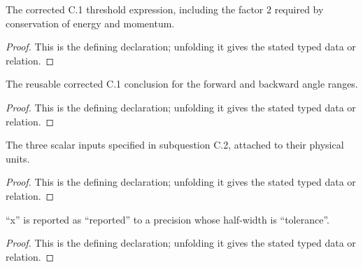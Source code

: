 \begin{definition}
  \label{decl:physics:IPhO_2026_1_C_2:quotedC1ThresholdExpression}
  The corrected C.1 threshold expression, including the factor \(2\) required by conservation of energy and momentum.
\end{definition}
\begin{proof}
  This is the defining declaration; unfolding it gives the stated typed data or relation.
\end{proof}

\begin{definition}
  \label{decl:physics:IPhO_2026_1_C_2:QuotedPreviousPartC1Result}
  The reusable corrected C.1 conclusion for the forward and backward angle ranges.
\end{definition}
\begin{proof}
  This is the defining declaration; unfolding it gives the stated typed data or relation.
\end{proof}

\begin{definition}[C2NumericalInputs]
  \label{decl:physics:IPhO_2026_1_C_2:C2NumericalInputs}
  The three scalar inputs specified in subquestion C.2, attached to their physical units.
\end{definition}
\begin{proof}
  This is the defining declaration; unfolding it gives the stated typed data or relation.
\end{proof}

\begin{definition}[RoundsTo]
  \label{decl:physics:IPhO_2026_1_C_2:RoundsTo}
  “x” is reported as “reported” to a precision whose half-width is “tolerance”.
\end{definition}
\begin{proof}
  This is the defining declaration; unfolding it gives the stated typed data or relation.
\end{proof}

